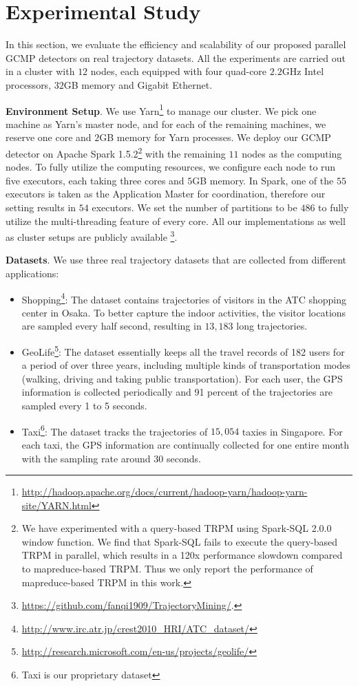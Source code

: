 \section{Experimental Study}
\label{sec:exp}
In this section, we evaluate the efficiency and scalability of our proposed parallel GCMP detectors on real trajectory datasets. All the experiments are carried out in a cluster with $12$ nodes, each equipped with four quad-core $2.2$GHz Intel processors, $32$GB memory and Gigabit Ethernet. 

\textbf{Environment Setup}. We use Yarn\footnote{\url{http://hadoop.apache.org/docs/current/hadoop-yarn/hadoop-yarn-site/YARN.html}} to manage our cluster. We pick one machine as Yarn's master node, and for each of the remaining machines, we reserve one core and $2$GB memory for Yarn processes. We deploy our GCMP detector on Apache Spark 1.5.2\footnote{We have experimented with a query-based TRPM using Spark-SQL 2.0.0 window function. 
We find that Spark-SQL fails to execute the query-based TRPM in parallel, which results in a 120x performance slowdown compared to mapreduce-based TRPM.
Thus we only report the performance of mapreduce-based TRPM in this work.} with the remaining $11$ nodes as the computing nodes.
To fully utilize the computing resources, we configure each node to run five executors, each taking three cores and $5$GB memory. In Spark, one of the $55$ executors is taken as the Application Master for coordination, therefore our setting results in $54$ executors.  We set the number of partitions to be $486$ to fully utilize the multi-threading feature of every core.
All our implementations as well as cluster setups are publicly available%
\footnote{\url{https://github.com/fanqi1909/TrajectoryMining/}.}.

\textbf{Datasets}. We use three real trajectory datasets that are collected from different applications:
\begin{itemize}
\item{Shopping}\footnote{\url{http://www.irc.atr.jp/crest2010_HRI/ATC_dataset/}}: The dataset contains
  trajectories of visitors in the ATC shopping center in Osaka. To better capture the indoor activities, the visitor locations are sampled every half second, resulting in $13,183$ long trajectories. 
\item{GeoLife}\footnote{\url{http://research.microsoft.com/en-us/projects/geolife/}}: The dataset essentially keeps all the travel records of 182 users for a period
of over three years, including multiple kinds of transportation modes (walking, driving and taking public
transportation). For each user, the GPS information is collected periodically and 91 percent of the trajectories
are sampled every 1 to 5 seconds.
\item{Taxi}\footnote{Taxi is our proprietary dataset}: The dataset tracks the trajectories of $15,054$ taxies in Singapore. For each taxi, the GPS information are continually collected for one entire month with the sampling rate around 30 seconds.
\end{itemize}


